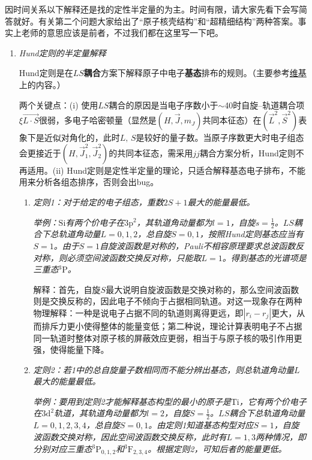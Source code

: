因时间关系以下解释还是找的定性半定量的为主。时间有限，请大家先看下会写简答就好。有关第二个问题大家给出了“原子核壳结构”和“超精细结构”两种答案。事实上老师的意思应该是前者，不过我们都在这里写一下吧。

\begin{enumerate}[label=\textbf{6.\Roman*}, listparindent=\parindent]

\item \emph{Hund定则的半定量解释}


Hund定则是在\textbf{$LS$耦合}方案下解释原子中电子\textbf{基态}排布的规则。（主要参考\href{https://en.wikipedia.org/wiki/Hund\%27s_rules}{维基}上的内容。）

两个关键点：(i) 使用$LS$耦合的原因是当电子序数小于$\sim$40时自旋--轨道耦合项$\xi\vec{L\cdot S}$很弱，多电子哈密顿量（显然是$(H,\vec{J},m_J)$共同本征态）在$(\vec{L}^2,\vec{S}^2)$表象下是近似对角化的，此时$L,\,S$是较好的量子数。当原子序数更大时电子组态会更接近于$(H,\vec{J}_1^2,\vec{J}_2^2)$的共同本征态，需采用$jj$耦合方案分析，Hund定则不再适用。(ii) Hund定则是定性半定量的理论，只适合解释基态电子排布，不能用来分析各组态排序，否则会出bug。

\begin{enumerate}
    \item \emph{定则1：对于给定的电子组态，重数$2S+1$最大的能量最低。}
    
    \emph{举例：$\mathrm{Si}$有两个价电子在$\mathrm{3p^2}$，其轨道角动量都为$l=1$，自旋$s=\frac{1}{2}$。$LS$耦合下总轨道角动量$L=0,1,2$，总自旋$S=0,1$，按照Hund定则基态应当有$S=1$。由于$S=1$自旋波函数是对称的，Pauli不相容原理要求总波函数反对称，则必须空间波函数交换反对称，只能取$L=1$。得到基态的光谱项是三重态$\mathrm{^3P}$。}
    
    解释：首先，自旋$S$最大说明自旋波函数是交换对称的，那么空间波函数则是交换反称的，因此电子不倾向于占据相同轨道。对这一现象存在两种物理解释：一种是说电子占据不同的轨道则离得更远，即$|r_i-r_j|$更大，从而排斥力更小使得整体的能量变低；第二种说，理论计算表明电子不占据同一轨道时整体对原子核的屏蔽效应更弱，相当于与原子核的吸引作用更强，使得能量下降。
    
    \item \emph{定则2：若1中的总自旋量子数相同而不能分辨出基态，则总轨道角动量$L$最大的能量最低。}
    
    \emph{举例：要用到定则2才能解释基态构型的最小的原子是$\mathrm{Ti}$，它有两个价电子在$\mathrm{3d^2}$轨道，其轨道角动量都为$l=2$，自旋$S=\frac{1}{2}$。$LS$耦合下总轨道角动量$L=0,1,2,3,4$，总自旋$S=0,1$。由定则1知道基态构型对应$S=1$，自旋波函数交换对称，因此空间波函数交换反称，此时有$L=1,3$两种情况，即分别对应三重态$\mathrm{^3P_{0,1,2}}$和$\mathrm{^3F_{2,3,4}}$。根据定则2，可知后者的能量更低。}
    

\end{enumerate}
\end{enumerate}
